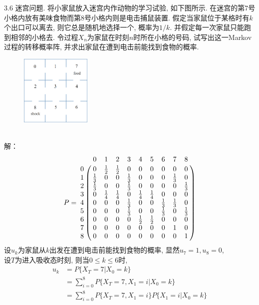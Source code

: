 3.6 迷宫问题. 将小家鼠放入迷宫内作动物的学习试验, 如下图所示. 在迷宫的第$7$号小格内放有美味食物而第$8$号小格内则是电击捕鼠装置. 假定当家鼠位于某格时有$k$个出口可以离去, 则它总是随机地选择一个, 概率为$1/k$. 并假定每一次家鼠只能跑到相邻的小格去. 令过程$X_n$为家鼠在时刻$n$时所在小格的号码, 试写出这一Markov过程的转移概率阵, 并求出家鼠在遭到电击前能找到食物的概率.\\
\begin{figure}[htbp]
	\centering
	\includegraphics[width=0.3\textwidth]{../resource/maze.png}
\end{figure}\\
解：\\
\[
P = 
\bordermatrix{
	~ & 0 & 1 & 2 & 3 & 4 & 5 & 6 & 7 & 8 \cr
	0 & 0 & \frac{1}{2} & \frac{1}{2} & 0 & 0 & 0 & 0 & 0 & 0 \cr
	1 & \frac{1}{3} & 0 & 0 & \frac{1}{3} & 0 & 0 & 0 & \frac{1}{3} & 0 \cr
	2 & \frac{1}{3} & 0 & 0 & \frac{1}{3} & 0 & 0 & 0 & 0 & \frac{1}{3}\cr
	3 & 0 & \frac{1}{4} & \frac{1}{4} & 0 & \frac{1}{4} & \frac{1}{4} & 0 & 0 & 0 \cr
	4 & 0 & 0 & 0 & \frac{1}{3} & 0 & 0 &\frac{1}{3} & \frac{1}{3} & 0 \cr
	5 & 0 & 0 & 0 & \frac{1}{3} & 0 & 0 &\frac{1}{3} & 0 & \frac{1}{3} \cr
	6 & 0 & 0 & 0 & 0 & \frac{1}{2} & \frac{1}{2} & 0 & 0 & 0 \cr
	7 & 0 & 0 & 0 & 0 & 0 & 0 & 0 & 1 & 0 \cr
	8 & 0 & 0 & 0 & 0 & 0 & 0 & 0 & 0 & 1 \cr
}
\]
设$u_k$为家鼠从$k$出发在遭到电击前能找到食物的概率, 显然$u_7 = 1, u_8 = 0$,\\
设$T$为进入吸收态时刻, 则当$0 \leqslant k \leqslant 6$时, 
\begin{align*}
u_k & = P\{X_T = 7 | X_0 = k\}\\
	& = \sum^8_{i=0}P\{X_T = 7, X_1 = i | X_0 = k\}\\
	& = \sum^8_{i=0}P\{X_T = 7, X_1 = i\} P\{X_1 = i | X_0 = k\}
\end{align*}
